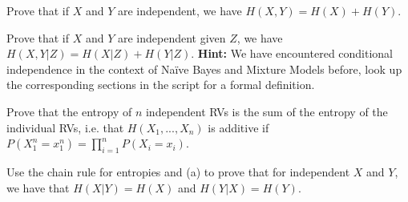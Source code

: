 \documentclass[a4paper,10pt,landscape,twocolumn]{scrartcl}
\begin{document}
\begin{exercise}
\begin{subex}
Prove that if $X$ and $Y$ are independent, we have $H(X,Y)=H(X) + H(Y)$. 
\end{subex}

\begin{subex}
Prove that if $X$ and $Y$ are independent given $Z$, we have $H(X,Y|Z)
= H(X|Z) + H(Y|Z)$. {\bf Hint:} We have encountered conditional
independence in the context of Na{\"i}ve Bayes and Mixture Models
before, look up the corresponding sections in the script for a formal definition.
\end{subex}

\begin{subex}
Prove that the entropy of $n$ independent RVs is the sum of the entropy of the individual RVs, i.e. that  $H(X_1, ..., X_n)$ is additive if $P(X_1^n=x_1^n) = \prod_{i = 1}^n P(X_i=x_i)$.
\end{subex}

\begin{subex}
Use the chain rule for entropies and (a) to prove that for
  independent $X$ and $Y$, we have that $H(X|Y) = H(X)$ and $H(Y|X) = H(Y)$.
\end{subex}

\end{exercise}
\end{document}
